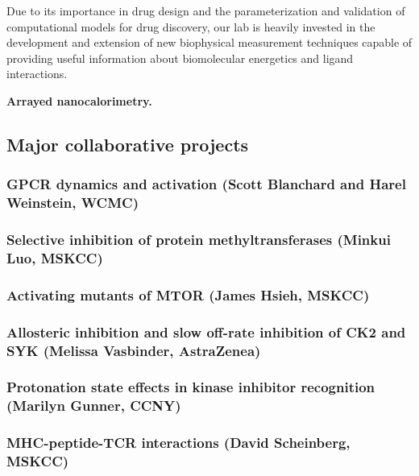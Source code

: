 \documentclass[10pt]{article}
\begin{document}
Due to its importance in drug design and the parameterization and validation of computational models for drug discovery, our lab is heavily invested in the development and extension of new biophysical measurement techniques capable of providing useful information about biomolecular energetics and ligand interactions.

{\bf Arrayed nanocalorimetry.}


\subsection*{Major collaborative projects}

\subsubsection*{GPCR dynamics and activation (Scott Blanchard and Harel Weinstein, WCMC)}

\subsubsection*{Selective inhibition of protein methyltransferases (Minkui Luo, MSKCC)}

\subsubsection*{Activating mutants of MTOR (James Hsieh, MSKCC)}

\subsubsection*{Allosteric inhibition and slow off-rate inhibition of CK2 and SYK (Melissa Vasbinder, AstraZenea)}

\subsubsection*{Protonation state effects in kinase inhibitor recognition (Marilyn Gunner, CCNY)}

\subsubsection*{MHC-peptide-TCR interactions (David Scheinberg, MSKCC)}
\end{document}
